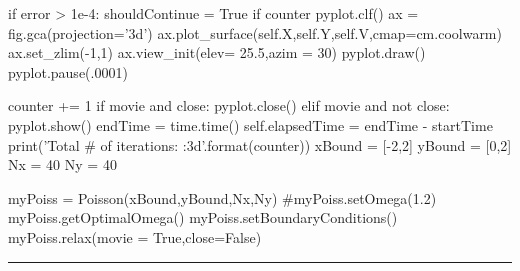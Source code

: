 \begin{codeexample}
\begin{VerbatimOut}{\listingFile}
                    if error > 1e-4:
                        shouldContinue = True
            if counter %
                pyplot.clf()
                ax = fig.gca(projection='3d')
                ax.plot_surface(self.X,self.Y,self.V,cmap=cm.coolwarm)
                ax.set_zlim(-1,1)
                ax.view_init(elev= 25.5,azim = 30)
                pyplot.draw()
                pyplot.pause(.0001)
                
            counter += 1
        if movie and close:
            pyplot.close()
        elif movie and not close:
            pyplot.show()
        endTime = time.time()
        self.elapsedTime = endTime - startTime
        print('Total # of iterations: {:3d}'.format(counter))
xBound = [-2,2]
yBound = [0,2]
Nx = 40
Ny = 40

myPoiss = Poisson(xBound,yBound,Nx,Ny)
#myPoiss.setOmega(1.2)
myPoiss.getOptimalOmega()
myPoiss.setBoundaryConditions()
myPoiss.relax(movie = True,close=False)
\end{VerbatimOut}
\end{codeexample}
\else
\noindent\rule{5 in}{0.01 in}
\fi

